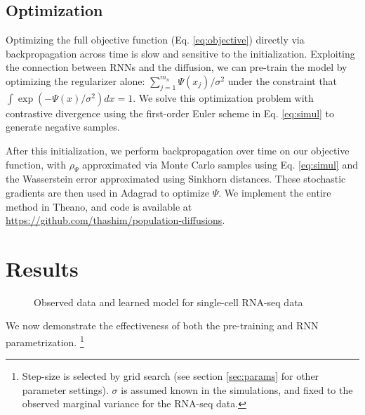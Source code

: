 \documentclass{article}
\begin{document}
\subsection{Optimization}

Optimizing the full objective function (Eq. \ref{eq:objective}) directly via backpropagation across time is slow and sensitive to the initialization.
Exploiting the connection between RNNs and the diffusion, we can pre-train the model by optimizing the regularizer alone: $\sum_{j=1}^{m_n} \Psi(x_j)/\sigma^2$ under the constraint that $\int \exp(-\Psi(x)/\sigma^2)dx = 1$. We solve this optimization problem with contrastive divergence \citep{hinton2002training} using the first-order Euler scheme in Eq. \ref{eq:simul} to generate negative samples.

After this initialization, we perform backpropagation over time on our objective function, with $\rho_{\Psi}$ approximated via Monte Carlo samples using Eq. \ref{eq:simul} and the Wasserstein error approximated using Sinkhorn distances. These stochastic gradients are then used in Adagrad to optimize $\Psi$\citep{duchi2011adaptive}. We implement the entire method in Theano, and code is available at \url{https://github.com/thashim/population-diffusions}.


\section{Results}


\begin{figure*}[ht!]
\vspace{-5pt}
\vspace{-16pt}
\caption{Observed data and learned model for single-cell RNA-seq data}
\vspace{-8pt}
\end{figure*}



We now demonstrate the effectiveness of both the pre-training and RNN parametrization.
\footnote{Step-size is selected by grid search (see section \ref{sec:params} for other parameter settings). $\sigma$ is assumed known in the simulations, and fixed to the observed marginal variance for the RNA-seq data.}
\end{document}
